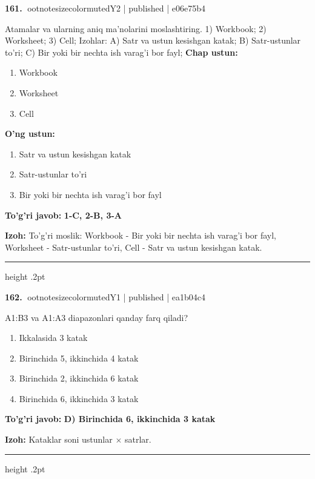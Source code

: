 \documentclass[10pt,a4paper]{article}
\begin{document}
\textbf{\color{ink}161.} {ootnotesizecolor{muted}Y2 | published | e06e75b4}
\par
Atamalar va ularning aniq ma'nolarini moslashtiring.  1) Workbook;  2) Worksheet;  3) Cell;  Izohlar: A) Satr va ustun kesishgan katak;  B) Satr-ustunlar to'ri;  C) Bir yoki bir nechta ish varag'i bor fayl;
\textbf{Chap ustun:}\begin{enumerate}[label=\arabic*),leftmargin=9mm]
\item Workbook
\item Worksheet
\item Cell
\end{enumerate}
\textbf{O'ng ustun:}\begin{enumerate}[label=\Alph*),leftmargin=9mm]
\item Satr va ustun kesishgan katak
\item Satr-ustunlar to'ri
\item Bir yoki bir nechta ish varag'i bor fayl
\end{enumerate}
\begin{tcolorbox}[enhanced,breakable,colback=teal!4,colframe=teal!55!black,boxrule=0.45pt,arc=1.2mm,left=2.8mm,right=2.8mm,top=2mm,bottom=2mm]
\textbf{\color{teal}To'g'ri javob:} \textbf{1-C, 2-B, 3-A}
\par\smallskip
\textbf{Izoh:} To'g'ri moslik: Workbook - Bir yoki bir nechta ish varag'i bor fayl, Worksheet - Satr-ustunlar to'ri, Cell - Satr va ustun kesishgan katak.
\end{tcolorbox}
\vspace{2mm}\hrule height .2pt\vspace{2mm}

\textbf{\color{ink}162.} {ootnotesizecolor{muted}Y1 | published | ea1b04c4}
\par
A1:B3 va A1:A3 diapazonlari qanday farq qiladi?
\begin{enumerate}[label=\Alph*),leftmargin=9mm]
\item Ikkalasida 3 katak
\item Birinchida 5, ikkinchida 4 katak
\item Birinchida 2, ikkinchida 6 katak
\item Birinchida 6, ikkinchida 3 katak
\end{enumerate}
\begin{tcolorbox}[enhanced,breakable,colback=teal!4,colframe=teal!55!black,boxrule=0.45pt,arc=1.2mm,left=2.8mm,right=2.8mm,top=2mm,bottom=2mm]
\textbf{\color{teal}To'g'ri javob:} \textbf{D) Birinchida 6, ikkinchida 3 katak}
\par\smallskip
\textbf{Izoh:} Kataklar soni ustunlar \ensuremath{\times} satrlar.
\end{tcolorbox}
\vspace{2mm}\hrule height .2pt\vspace{2mm}
\end{document}
